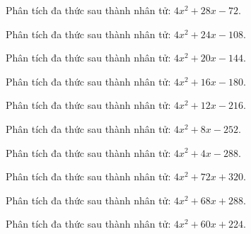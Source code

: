 \begin{bt}
	Phân tích đa thức sau thành nhân tử: $4 x^2 + 28 x - 72$.
\end{bt}
\begin{bt}
	Phân tích đa thức sau thành nhân tử: $4 x^2 + 24 x - 108$.
\end{bt}
\begin{bt}
	Phân tích đa thức sau thành nhân tử: $4 x^2 + 20 x - 144$.
\end{bt}
\begin{bt}
	Phân tích đa thức sau thành nhân tử: $4 x^2 + 16 x - 180$.
\end{bt}
\begin{bt}
	Phân tích đa thức sau thành nhân tử: $4 x^2 + 12 x - 216$.
\end{bt}
\begin{bt}
	Phân tích đa thức sau thành nhân tử: $4 x^2 + 8 x - 252$.
\end{bt}
\begin{bt}
	Phân tích đa thức sau thành nhân tử: $4 x^2 + 4 x - 288$.
\end{bt}
\begin{bt}
	Phân tích đa thức sau thành nhân tử: $4 x^2 + 72 x + 320$.
\end{bt}
\begin{bt}
	Phân tích đa thức sau thành nhân tử: $4 x^2 + 68 x + 288$.
\end{bt}
\begin{bt}
	Phân tích đa thức sau thành nhân tử: $4 x^2 + 60 x + 224$.
\end{bt}
